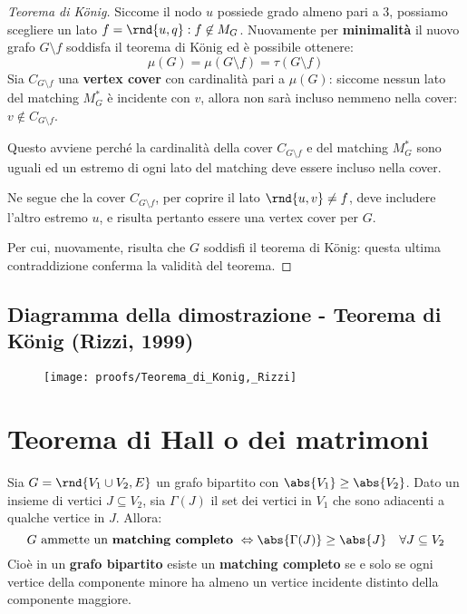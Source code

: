 \documentclass[\main/main.tex]{subfiles}
\begin{document}
\begin{proof}[Teorema di König]
	Siccome il nodo \(u\) possiede grado almeno pari a \(3\), possiamo scegliere un lato \(f=\rnd{u,q}: f \not\in M_G\). Nuovamente per \textbf{minimalità} il nuovo grafo \(G\setminus f\) soddisfa il teorema di König ed è possibile ottenere:
	\[\mu(G) = \mu(G\setminus f) = \tau(G\setminus f)\]
	Sia \(C_{G\setminus f}\) una \textbf{vertex cover} con cardinalità pari a \(\mu(G)\): siccome nessun lato del matching \(M^*_G\) è incidente con \(v\), allora non sarà incluso nemmeno nella cover: \(v \not\in C_{G\setminus f}\).

	Questo avviene perché la cardinalità della cover \(C_{G\setminus f}\) e del matching \(M^*_G\) sono uguali ed un estremo di ogni lato del matching deve essere incluso nella cover.

	Ne segue che la cover \(C_{G\setminus f}\), per coprire il lato \(\rnd{u,v} \neq f\), deve includere l'altro estremo \(u\), e risulta pertanto essere una vertex cover per \(G\).

	Per cui, nuovamente, risulta che \(G\) soddisfi il teorema di König: questa ultima contraddizione conferma la validità del teorema.
\end{proof}
\clearpage
\subsection{Diagramma della dimostrazione - Teorema di König (Rizzi, 1999)}
\begin{figure}
	\texttt{[image: proofs/Teorema\_di\_Konig,\_Rizzi]}
\end{figure}
\clearpage
\section{Teorema di Hall o dei matrimoni}
\begin{theorem}
	Sia \(G = \rnd{V_1 \cup V_2, E}\) un grafo bipartito con \(\abs{V_1} \geq \abs{V_2}\). Dato un insieme di vertici \(J \subseteq V_2\), sia \(\Gamma(J) \) il set dei vertici in \(V_1\) che sono adiacenti a qualche vertice in \(J\). Allora:
	\[
		G \text{ ammette un \textbf{matching completo} } \Leftrightarrow \abs{\Gamma(J)} \geq \abs{J} \quad \forall J \subseteq V_2
	\]
	Cioè in un \textbf{grafo bipartito} esiste un \textbf{matching completo} se e solo se ogni vertice della componente minore ha almeno un vertice incidente distinto della componente maggiore.
\end{theorem}
\end{document}
